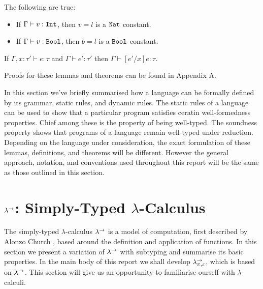 \begin{lemma}
The following are true:
\begin{itemize}
	\setlength\itemsep{-0.7em}
	\item If $\Gamma \vdash v: \mathtt{Int}$, then $v = l$ is a $\mathtt{Nat}$ constant.
	\item If $\Gamma \vdash v: \mathtt{Bool}$, then $b = l$ is a $\mathtt{Bool}$ constant.
\end{itemize}
\end{lemma}


\begin{lemma}[Substitution]
If $\Gamma, x: \tau' \vdash e: \tau$ and $\Gamma \vdash e': \tau'$ then $\Gamma \vdash [e'/x]e:  \tau$.
\end{lemma}

Proofs for these lemmas and theorems can be found in Appendix A.

In this section we've briefly summarised how a language can be formally defined by its grammar, static rules, and dynamic rules. The static rules of a language can be used to show that a particular program satisfies ceratin well-formedness properties. Chief among these is the property of being well-typed. The soundness property shows that programs of a language remain well-typed under reduction. Depending on the language under consideration, the exact formulation of these lemmas, definitions, and theorems will be different. However the general approach, notation, and conventions used throughout this report will be the same as those outlined in this section.





















\section{ $\lambda^{\rightarrow}$: Simply-Typed $\lambda$-Calculus}

The simply-typed $\lambda$-calculus $\lambda^{\rightarrow}$ is a model of computation, first described by Alonzo Church \cite{church40}, based around the definition and application of functions. In this section we present a variation of $\lambda^{\rightarrow}$ with subtyping and summarise its basic properties. In the main body of this report we shall develop $\lambda^{\rightarrow}_{\pi, \varepsilon}$, which is based on $\lambda^{\rightarrow}$. This section will give us an opportunity to familiarise ourself with $\lambda$-calculi.

